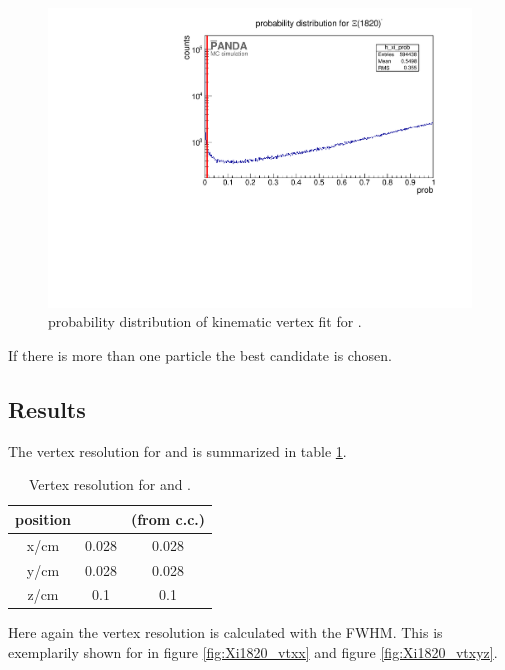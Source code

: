 		\begin{figure}
			\centering
			\includegraphics[width=1.\textwidth]{./plots/Xi1820/XiMinus1820_prob.pdf}
			\caption{\propose \chisq probability distribution of kinematic vertex fit for \excitedcascade.}
			\label{fig:xi1820_prob}
		\end{figure}
		
		If there is more than one particle the best candidate is chosen.
		
	\subsection*{Results}
	The vertex resolution for \excitedcascade and \excitedanticascade is summarized in table \ref{tab:Xi1820_vtxres}.
	
	\begin{table}
		\centering
		\caption{\propose Vertex resolution for \excitedcascade and \excitedanticascade.}
		\label{tab:Xi1820_vtxres}
		\begin{tabular}{ccc}
			\hline
			position & \excitedcascade & \excitedanticascade (from c.c.) \\
			\hline
			\hline
			x/cm & 0.028 & 0.028\\
			y/cm & 0.028 & 0.028\\
			z/cm & 0.1 & 0.1\\
			\hline
			 
		\end{tabular}
	\end{table}
	
	Here again the vertex resolution is calculated with the FWHM. 
	This is exemplarily shown for \excitedcascade in figure \ref{fig:Xi1820_vtxx} and figure \ref{fig:Xi1820_vtxyz}.
	
